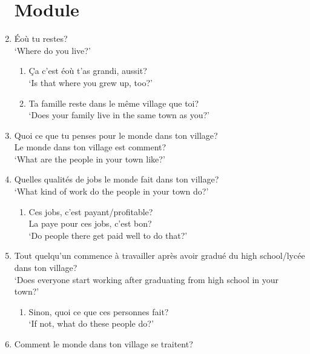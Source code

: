\documentclass{article}
\begin{document}
\begin{enumerate}
        \section{Module}
            \item Éoù tu restes?\\
                  `Where do you live?'
            \begin{enumerate}
                \item Ça c'est éoù t'as grandi, aussit?\\
                      `Is that where you grew up, too?'
                \item Ta famille reste dans le même village que toi?\\
                      `Does your family live in the same town as you?'
            \end{enumerate}
            \item Quoi ce que tu penses pour le monde dans ton village?\\
                  Le monde dans ton village est comment?\\
                  `What are the people in your town like?'
            \item Quelles qualités de jobs le monde fait dans ton village?\\
                  `What kind of work do the people in your town do?'
            \begin{enumerate}
                \item Ces jobs, c'est payant/profitable?\\
                      La paye pour ces jobs, c'est bon?\\
                      `Do people there get paid well to do that?'
            \end{enumerate}
            \item Tout quelqu'un commence à travailler après avoir gradué du high school/lycée dans ton village?\\
                  `Does everyone start working after graduating from high school in your town?'
                \begin{enumerate}
                    \item Sinon, quoi ce que ces personnes fait?\\
                          `If not, what do these people do?'
                \end{enumerate}
            \item Comment le monde dans ton village se traitent?\\

\end{enumerate}
\end{document}
